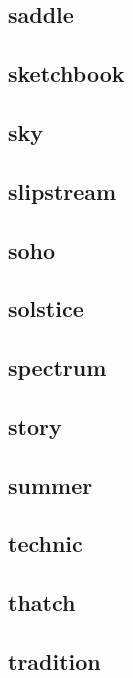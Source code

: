 \subsection{\ttfamily saddle}
\newpage
\subsection{\ttfamily sketchbook}
\newpage
\subsection{\ttfamily sky}
\newpage
\subsection{\ttfamily slipstream}
\newpage
\subsection{\ttfamily soho}
\newpage
\subsection{\ttfamily solstice}
\newpage
\subsection{\ttfamily spectrum}
\newpage
\subsection{\ttfamily story}
\newpage
\subsection{\ttfamily summer}
\newpage
\subsection{\ttfamily technic}
\newpage
\subsection{\ttfamily thatch}
\newpage
\subsection{\ttfamily tradition}
\newpage
